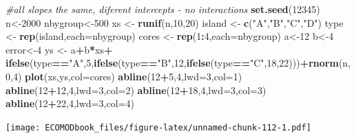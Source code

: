 \documentclass[
]{book}
\newenvironment{Shaded}{\begin{snugshade}}{\end{snugshade}}
\newcommand{\CommentTok}[1]{\textcolor[rgb]{0.56,0.35,0.01}{\textit{#1}}}
\newcommand{\DataTypeTok}[1]{\textcolor[rgb]{0.13,0.29,0.53}{#1}}
\newcommand{\DecValTok}[1]{\textcolor[rgb]{0.00,0.00,0.81}{#1}}
\newcommand{\KeywordTok}[1]{\textcolor[rgb]{0.13,0.29,0.53}{\textbf{#1}}}
\newcommand{\NormalTok}[1]{#1}
\newcommand{\OperatorTok}[1]{\textcolor[rgb]{0.81,0.36,0.00}{\textbf{#1}}}
\newcommand{\StringTok}[1]{\textcolor[rgb]{0.31,0.60,0.02}{#1}}
\begin{document}
\begin{Shaded}
\begin{Highlighting}[]
\CommentTok{#all slopes the same, diferent intercepts - no interactions}
\KeywordTok{set.seed}\NormalTok{(}\DecValTok{12345}\NormalTok{)}
\NormalTok{n<-}\DecValTok{2000}
\NormalTok{nbygroup<-}\DecValTok{500}
\NormalTok{xs <-}\StringTok{ }\KeywordTok{runif}\NormalTok{(n,}\DecValTok{10}\NormalTok{,}\DecValTok{20}\NormalTok{)}
\NormalTok{island <-}\StringTok{ }\KeywordTok{c}\NormalTok{(}\StringTok{"A"}\NormalTok{,}\StringTok{"B"}\NormalTok{,}\StringTok{"C"}\NormalTok{,}\StringTok{"D"}\NormalTok{)}
\NormalTok{type <-}\StringTok{ }\KeywordTok{rep}\NormalTok{(island,}\DataTypeTok{each=}\NormalTok{nbygroup)}
\NormalTok{cores <-}\StringTok{ }\KeywordTok{rep}\NormalTok{(}\DecValTok{1}\OperatorTok{:}\DecValTok{4}\NormalTok{,}\DataTypeTok{each=}\NormalTok{nbygroup)}
\NormalTok{a<-}\DecValTok{12}
\NormalTok{b<-}\DecValTok{4}
\NormalTok{error<-}\DecValTok{4}
\NormalTok{ys <-}\StringTok{ }\NormalTok{a}\OperatorTok{+}\NormalTok{b}\OperatorTok{*}\NormalTok{xs}\OperatorTok{+}
\KeywordTok{ifelse}\NormalTok{(type}\OperatorTok{==}\StringTok{"A"}\NormalTok{,}\DecValTok{5}\NormalTok{,}\KeywordTok{ifelse}\NormalTok{(type}\OperatorTok{==}\StringTok{"B"}\NormalTok{,}\DecValTok{12}\NormalTok{,}\KeywordTok{ifelse}\NormalTok{(type}\OperatorTok{==}\StringTok{"C"}\NormalTok{,}\DecValTok{18}\NormalTok{,}\DecValTok{22}\NormalTok{)))}\OperatorTok{+}\KeywordTok{rnorm}\NormalTok{(n,}\DecValTok{0}\NormalTok{,}\DecValTok{4}\NormalTok{)}
\KeywordTok{plot}\NormalTok{(xs,ys,}\DataTypeTok{col=}\NormalTok{cores)}
\KeywordTok{abline}\NormalTok{(}\DecValTok{12}\OperatorTok{+}\DecValTok{5}\NormalTok{,}\DecValTok{4}\NormalTok{,}\DataTypeTok{lwd=}\DecValTok{3}\NormalTok{,}\DataTypeTok{col=}\DecValTok{1}\NormalTok{)}
\KeywordTok{abline}\NormalTok{(}\DecValTok{12}\OperatorTok{+}\DecValTok{12}\NormalTok{,}\DecValTok{4}\NormalTok{,}\DataTypeTok{lwd=}\DecValTok{3}\NormalTok{,}\DataTypeTok{col=}\DecValTok{2}\NormalTok{)}
\KeywordTok{abline}\NormalTok{(}\DecValTok{12}\OperatorTok{+}\DecValTok{18}\NormalTok{,}\DecValTok{4}\NormalTok{,}\DataTypeTok{lwd=}\DecValTok{3}\NormalTok{,}\DataTypeTok{col=}\DecValTok{3}\NormalTok{)}
\KeywordTok{abline}\NormalTok{(}\DecValTok{12}\OperatorTok{+}\DecValTok{22}\NormalTok{,}\DecValTok{4}\NormalTok{,}\DataTypeTok{lwd=}\DecValTok{3}\NormalTok{,}\DataTypeTok{col=}\DecValTok{4}\NormalTok{)}
\end{Highlighting}
\end{Shaded}

\texttt{[image: ECOMODbook\_files/figure-latex/unnamed-chunk-112-1.pdf]}
\end{document}
